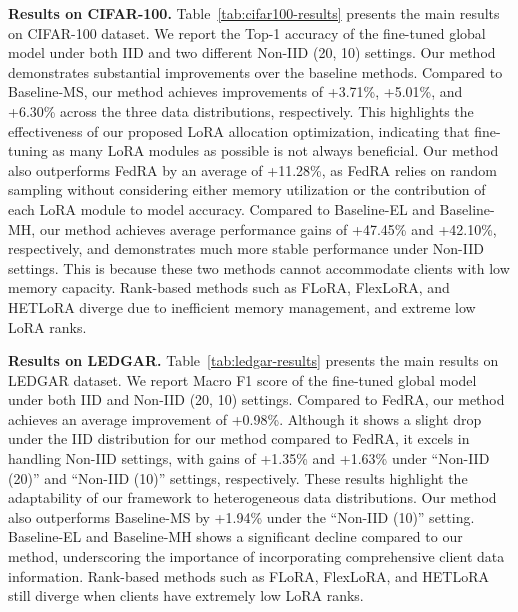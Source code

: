 \documentclass[sigconf]{acmart}
\begin{document}
\textbf{Results on CIFAR-100.} Table~\ref{tab:cifar100-results} presents the main results on CIFAR-100 dataset. We report the Top-1 accuracy of the fine-tuned global model under both IID and two different Non-IID (20, 10) settings. Our method demonstrates substantial improvements over the baseline methods. 
Compared to Baseline-MS, our method achieves improvements of +3.71\%, +5.01\%, and +6.30\% across the three data distributions, respectively. This highlights the effectiveness of our proposed LoRA allocation optimization, indicating that fine-tuning as many LoRA modules as possible is not always beneficial.
Our method also outperforms FedRA by an average of +11.28\%, as FedRA relies on random sampling without considering either memory utilization or the contribution of each LoRA module to model accuracy.
Compared to Baseline-EL and Baseline-MH, our method achieves average performance gains of +47.45\% and +42.10\%, respectively, and demonstrates much more stable performance under Non-IID settings. This is because these two methods cannot accommodate clients with low memory capacity.
Rank-based methods such as FLoRA, FlexLoRA, and HETLoRA diverge due to inefficient memory management, and extreme low LoRA ranks.

\textbf{Results on LEDGAR.} Table~\ref{tab:ledgar-results} presents the main results on LEDGAR dataset. We report Macro F1 score of the fine-tuned global model under both IID and Non-IID (20, 10) settings.
Compared to FedRA, our method achieves an average improvement of +0.98\%. Although it shows a slight drop under the IID distribution for our method compared to FedRA, it excels in handling Non-IID settings, with gains of +1.35\% and +1.63\% under ``Non-IID (20)'' and ``Non-IID (10)'' settings, respectively. These results highlight the adaptability of our framework to heterogeneous data distributions. 
Our method also outperforms Baseline-MS by +1.94\% under the ``Non-IID (10)'' setting.
Baseline-EL and Baseline-MH shows a significant decline compared to our method, underscoring the importance of incorporating comprehensive client data information. Rank-based methods such as FLoRA, FlexLoRA, and HETLoRA still diverge when clients have extremely low LoRA ranks.
\end{document}

